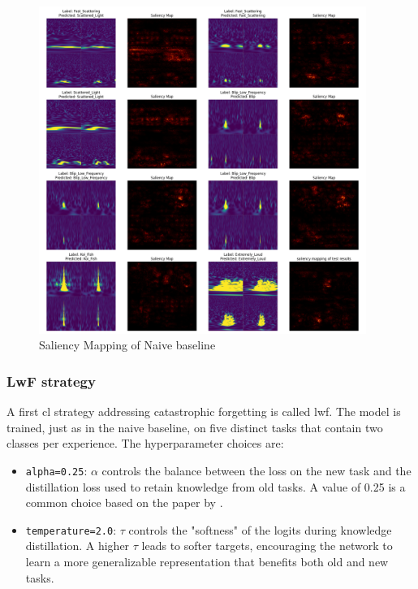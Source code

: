 \begin{figure}
    \centering
    \includegraphics[width=0.95\textwidth]{Grad Assignment/Images/SaliencyMapping_Naive_MultiView_100epochs.png}
    \caption{Saliency Mapping of Naive baseline}
    \label{fig:saliency_naive_baseline}
\end{figure}

\newpage
\subsubsection{LwF strategy}
\label{subsubsec:RQ1_LWF}
A first \acrshort{cl} strategy addressing catastrophic forgetting is called \acrfull{lwf}. The model is trained, just as in the naive baseline, on five distinct tasks that contain two classes per experience. 
The hyperparameter choices are: 
\begin{itemize}
    \item \verb|alpha=0.25|: $\alpha$ controls the balance between the loss on the new task and the distillation loss used to retain knowledge from old tasks. A value of 0.25 is a common choice based on the paper by \citep{oren2021defense}. 
    \item \verb|temperature=2.0|: $\tau$ controls the "softness" of the logits during knowledge distillation. A higher $\tau$ leads to softer targets, encouraging the network to learn a more generalizable representation that benefits both old and new tasks. 
\end{itemize}

